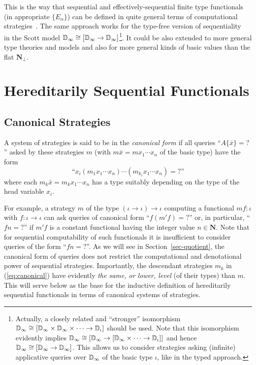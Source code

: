 \documentclass[fleqn]{LMCS}
\theoremstyle{plain}\newtheorem{satz}[thm]{Satz}
\theoremstyle{plain}\newtheorem{hyp}[thm]{Hypothesis}
\theoremstyle{plain}\newtheorem{hyps}[thm]{Hypotheses}
\theoremstyle{definition}\newtheorem{note}[thm]{Note}
\newcommand{\setof}[1]{\{#1\}}
\newcommand{\arr}{\rightarrow}
\newcommand{\NN}{\mathbf{N}}
\newcommand{\Undef}{{\perp}}
\newcommand{\bx}{\bar{x}}
\newcommand{\?}{\mbox{?}}
\begin{document}
\noindent
This is the way that sequential and effectively-sequential finite type functionals 
(in appropriate $\setof{E_\alpha}$) can be defined in quite general terms of 
computational strategies~\cite{Saz76AL}. The same approach works for the 
type-free version of sequentiality~\cite{Saz76SMZH} in the Scott model 
$\bbD_\infty \cong [\bbD_\infty \arr \bbD_\infty]$\footnote{\label{foot:Dinfty}
Actually, a closely related and ``stronger'' isomorphism 
$\bbD_\infty \cong [\bbD_\infty\times \bbD_\infty\times\cdots\arr
\bbD_\iota]$ should be used. 
Note that this isomorphism evidently implies 
$\bbD_\infty \cong [\bbD_\infty\arr[\bbD_\infty\times\cdots\arr \bbD_\iota]]$
and hence 
$\bbD_\infty \cong [\bbD_\infty\arr\bbD_\infty]$.
This allows us to consider strategies asking (infinite) 
applicative queries over $\mathbb{D}_\infty$ 
of the basic type $\iota$, like in the typed approach. 
}. 
It could be also extended to more 
general type theories and models and also for more general kinds 
of basic values than the flat $\NN_\Undef$. 





\section{Hereditarily Sequential Functionals}
\label{sec-seq-func}


\subsection{Canonical Strategies}
\label{sec:canonical}

\begin{defi}\label{def:canonical}
A system of strategies is said to be in the \emph{canonical form} if
all queries ``$A\{\bx\}=\?$'' asked by these strategies 
$m$ (with $m\bx=mx_1\cdots x_n$ of the basic type) have the form 
\begin{equation}\label{eq:canonical}
\mbox{``}x_i(m_1 x_1\cdots x_n)\cdots(m_{k_i}x_1\cdots x_n)=\?\mbox{''}
\end{equation}
\noindent
where each $m_k\bx=m_kx_1\cdots x_n$ 
has a type suitably depending on the type of the head variable $x_i$.
\end{defi}


\noindent
For example, a strategy $m$ of the type $(\iota\arr\iota)\arr\iota$ 
computing a functional $mf:\iota$ with $f:\iota\arr\iota$ 
can ask queries of canonical form 
``$f(m'f)=\?$'' or, in particular, ``$fn=\?$'' 
if $m'f$ is a constant functional having the integer value $n\in\NN$. 
Note that for sequential computability of such functionals 
it is insufficient to consider queries of the form ``$fn=\?$''. 
As we will see in Section~\ref{sec-quotient}, 
the canonical form of queries does not restrict the 
computational and denotational power of sequential strategies. 
Importantly, the descendant strategies $m_k$ in (\ref{eq:canonical}) 
have evidently \emph{the same, or lower, level} 
(of their types) than $m$.
This will serve below as the base for the inductive definition of 
hereditarily sequential functionals in terms of canonical systems 
of strategies. 
\end{document}
